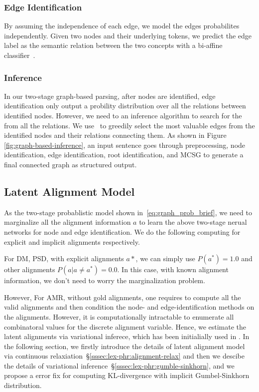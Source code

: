 \subsubsection{Edge Identification}
\label{sssec:lex-phr:edge-ident}

By assuming the independence of each edge, we model the edges
probabilites independently.  Given two nodes and their underlying
tokens, we predict the edge label as the semantic relation between the
two concepts with a bi-affine classifier~\cite{dozat2016deep}.

\subsubsection{Inference}
\label{sssec:lex-phr:inference}
In our two-stage graph-based parsing, after nodes are identified, edge
identification only output a probility distribution over all the
relations between identified nodes. However, we need to an inference
algorithm to search for the  from all
the relations. We use~\citet[MSCG,][]{Flanigan:2014vc} to greedily
select the most valuable edges from the identified nodes and their
relations connecting them. As shown in Figure
\ref{fig:graph-based-inference}, an input sentence goes through
preprocessing, node identification, edge identification, root
identification, and MCSG to generate a final connected graph as
structured output.

\subsection{Latent Alignment Model}
\label{ssec:lex-phr:latent-alignment}

As the two-stage probablistic model shown
in~\autoref{eq:graph_prob_brief}, we need to marginalize all the
alignment information $a$ to learn the above two-stage nerual networks
for node and edge identification. We do the following computing for
explicit and implicit alignments respectively.

 For DM, PSD, with explicit alignments
$a*$, we can simply use $P(a^{*}) = 1.0$ and other alignments
$P(a | a \neq a^{*}) = 0.0 $. In this case, with known alignment
information, we don't need to worry the marginalization problem.

 However, For AMR, without gold
alignments, one requires to compute all the valid alignments and then
condition the node- and edge-identification methods on the alignments.
However, it is computationally intractable to enumerate all
combinatoral values for the discrete alignment variable. Hence, we
estimate the latent alignments via variational inferece, which has
been initialially used in \citet{lyu2018amr}. In the following
section, we firstly introduce the details of latent alignment model
via continuous relaxiation~\S\ref{sssec:lex-phr:alignment-relax} and
then we descibe the details of variational
inference~\S\ref{sssec:lex-phr:gumble-sinkhorn}, and we propose a
error fix for computing KL-divergence with implicit Gumbel-Sinkhorn
distribution.

